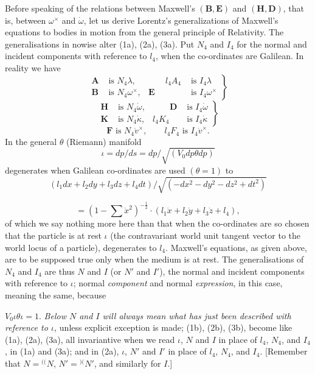 \documentclass[11pt]{article}
\newcommand{\markpair}[3]{{}^{#1#2}#3}
\begin{document}
\indent Before speaking of the relations between Maxwell's $(\mathbf{B},\mathbf{E})$ and $(\mathbf{H},\mathbf{D})$, that is, between $\omega^\times$ and $\dot\omega$, let us derive Lorentz's generalizations of Maxwell's equations to bodies in motion from the general principle of Relativity. The generalisations in nowise alter (1a), (2a), (3a). Put $N_4$ and $I_4$ for the normal and incident components with reference to $l_4$, when the co-ordinates are Galilean. In reality we have
\begin{equation}
  \left.\begin{aligned}
    \mathbf{A}&\text{ is }N_4\lambda, &\qquad l_4A_4&\text{ is }I_4\lambda\\
    \mathbf{B}&\text{ is }N_4\omega^\times, & \mathbf{E}&\text{ is }I_4\omega^\times
  \end{aligned}\right\}
  \tag{1b}
\end{equation}
\begin{equation}
  \left.\begin{aligned}
    \mathbf{H}&\text{ is }N_4\dot\omega, &\qquad \mathbf{D}&\text{ is }I_4\dot\omega\\
    \mathbf{K}&\text{ is }N_4\dot\kappa, & l_4K_4&\text{ is }I_4\dot\kappa
  \end{aligned}\right\}
  \tag{2b}
\end{equation}
\begin{equation}
  \mathbf{F}\text{ is }N_4\dot v^\times,\qquad l_4F_4\text{ is }I_4\dot v^\times.
  \tag{3b}
\end{equation}
In the general $\theta$ (Riemann) manifold
\[
  \iota=dp/ds=dp/\sqrt{(V_0dp\theta dp)}
\]
degenerates when Galilean co-ordinates are used $(\theta=1)$ to
\[
  (l_1dx+l_2dy+l_3dz+l_4dt)/\sqrt{(-dx^2-dy^2-dz^2+dt^2)}
\]

\[
  =(1-\sum\dot x^2)^{-\frac12}\cdot(l_1\dot x+l_2\dot y+l_3\dot z+l_4),
\]
of which we say nothing more here than that when the co-ordinates are so chosen that the particle is at rest $\iota$ (the contravariant world unit tangent vector to the world locus of a particle), degenerates to $l_4$. Maxwell's equations, as given above, are to be supposed true only when the medium is at rest. The generalisations of $N_4$ and $I_4$ are thus $N$ and $I$ (or $N'$ and $I'$), the normal and incident components with reference to $\iota$; normal \emph{component} and normal \emph{expression}, in this case, meaning the same, because

$V_0\iota\theta\iota=1$. \emph{Below $N$ and $I$ will always mean what has just been described with reference to $\iota$,} unless explicit exception is made; (1b), (2b), (3b), become like (1a), (2a), (3a), all invariantive when we read $\iota$, $N$ and $I$ in place of $l_4$, $N_4$, and $I_4$, in (1a) and (3a); and in (2a), $\iota$, $N'$ and $I'$ in place of $l_4$, $N_4$, and $I_4$. [Remember that $N=\markpair{(}{(}{N}$, $N'=\markpair{)}{(}{N'}$, and similarly for $I$.]
\end{document}
